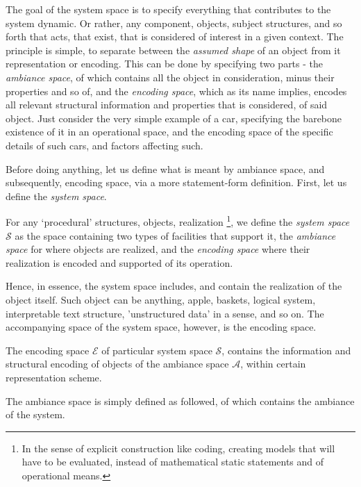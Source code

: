 The goal of the system space is to specify everything that contributes to the system dynamic. Or rather, any component, objects, subject structures, and so forth that acts, that exist, that is considered of interest in a given context. The principle is simple, to separate between the \textit{assumed shape} of an object from it representation or encoding. This can be done by specifying two parts - the \textit{ambiance space}, of which contains all the object in consideration, minus their properties and so of, and the \textit{encoding space}, which as its name implies, encodes all relevant structural information and properties that is considered, of said object. Just consider the very simple example of a car, specifying the barebone existence of it in an operational space, and the encoding space of the specific details of such cars, and factors affecting such. 

Before doing anything, let us define what is meant by ambiance space, and subsequently, encoding space, via a more statement-form definition. First, let us define the \textit{system space}. 
\begin{definition}
  For any `procedural' structures, objects, realization \footnote{In the sense of explicit construction like coding, creating models that will have to be evaluated, instead of mathematical static statements and of operational means.}, we define the \textit{system space} $\mathcal{S}$ as the space containing two types of facilities that support it, the \textit{ambiance space} for where objects are realized, and the \textit{encoding space} where their realization is encoded and supported of its operation. 
\end{definition}

Hence, in essence, the system space includes, and contain the realization of the object itself. Such object can be anything, apple, baskets, logical system, interpretable text structure, 'unstructured data' in a sense, and so on. The accompanying space of the system space, however, is the encoding space. 

\begin{definition}
    The encoding space $\mathcal{E}$ of particular system space $\mathcal{S}$, contains the information and structural encoding of objects of the ambiance space $\mathcal{A}$, within certain representation scheme. 
\end{definition}

The ambiance space is simply defined as followed, of which contains the ambiance of the system. 

